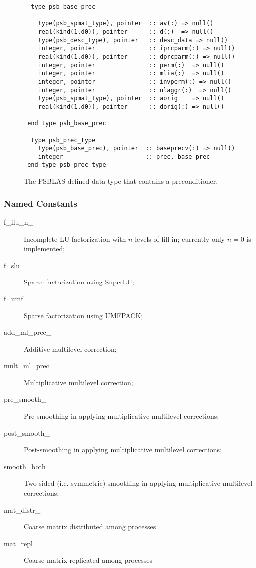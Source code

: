 \begin{figure}[h!]
  \small
  \begin{Sbox}
    \begin{minipage}[tl]{0.9\textwidth}
\begin{verbatim}
  type psb_base_prec

    type(psb_spmat_type), pointer  :: av(:) => null()
    real(kind(1.d0)), pointer      :: d(:)  => null()
    type(psb_desc_type), pointer   :: desc_data => null()
    integer, pointer               :: iprcparm(:) => null()
    real(kind(1.d0)), pointer      :: dprcparm(:) => null()
    integer, pointer               :: perm(:)  => null()
    integer, pointer               :: mlia(:)  => null()
    integer, pointer               :: invperm(:) => null()
    integer, pointer               :: nlaggr(:)  => null()
    type(psb_spmat_type), pointer  :: aorig    => null()
    real(kind(1.d0)), pointer      :: dorig(:) => null()
    
 end type psb_base_prec
  
  type psb_prec_type
    type(psb_base_prec), pointer  :: baseprecv(:) => null()
    integer                       :: prec, base_prec
 end type psb_prec_type
\end{verbatim}
    \end{minipage}
  \end{Sbox}
  \setlength{\fboxsep}{8pt}
  \begin{center}
    \fbox{\TheSbox}
  \end{center}
  \caption{\label{fig:prectype}The PSBLAS defined data type that contains a preconditioner.}
\end{figure}
\subsubsection{Named Constants}
\label{sec:prec_constants}
\begin{description}
\item[f\_ilu\_n\_] Incomplete LU factorization with $n$ levels of
  fill-in; currently only $n=0$ is implemented;
\item[f\_slu\_]  Sparse factorization using SuperLU;
\item[f\_umf\_]  Sparse factorization using UMFPACK;
\item[add\_ml\_prec\_] Additive multilevel correction;
\item[mult\_ml\_prec\_] Multiplicative multilevel correction;
\item[pre\_smooth\_] Pre-smoothing in applying multiplicative
  multilevel corrections;
\item[post\_smooth\_] Post-smoothing in applying multiplicative
  multilevel corrections;
\item[smooth\_both\_] Two-sided (i.e. symmetric) smoothing in applying multiplicative
  multilevel corrections;
\item[mat\_distr\_] Coarse matrix distributed among processes
\item[mat\_repl\_] Coarse matrix replicated among processes
\end{description}


